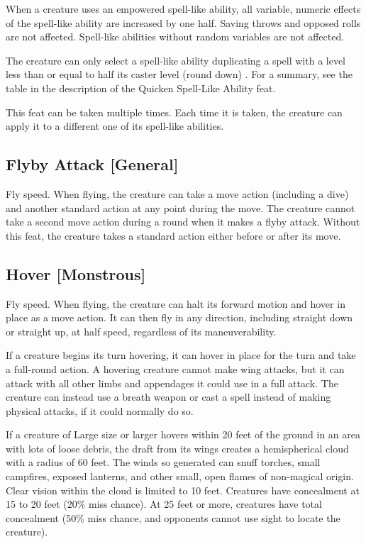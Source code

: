 When a creature uses an empowered spell-like ability, all variable, numeric effects of the spell-like ability are increased by one half. Saving throws and opposed rolls are not affected. Spell-like abilities without random variables are not affected.

The creature can only select a spell-like ability duplicating a spell with a level less than or equal to half its caster level (round down) . For a summary, see the table in the description of the Quicken Spell-Like Ability feat. 

 This feat can be taken multiple times. Each time it is taken, the creature can apply it to a different one of its spell-like abilities.

\subsection{Flyby Attack [General]}
 Fly speed.
 When flying, the creature can take a move action (including a dive) and another standard action at any point during the move. The creature cannot take a second move action during a round when it makes a flyby attack.
 Without this feat, the creature takes a standard action either before or after its move.

\subsection{Hover [Monstrous]}
 Fly speed.
 When flying, the creature can halt its forward motion and hover in place as a move action. It can then fly in any direction, including straight down or straight up, at half speed, regardless of its maneuverability.

If a creature begins its turn hovering, it can hover in place for the turn and take a full-round action. A hovering creature cannot make wing attacks, but it can attack with all other limbs and appendages it could use in a full attack. The creature can instead use a breath weapon or cast a spell instead of making physical attacks, if it could normally do so.

If a creature of Large size or larger hovers within 20 feet of the ground in an area with lots of loose debris, the draft from its wings creates a hemispherical cloud with a radius of 60 feet. The winds so generated can snuff torches, small campfires, exposed lanterns, and other small, open flames of non-magical origin. Clear vision within the cloud is limited to 10 feet. Creatures have concealment at 15 to 20 feet (20\% miss chance). At 25 feet or more, creatures have total concealment (50\% miss chance, and opponents cannot use sight to locate the creature).

